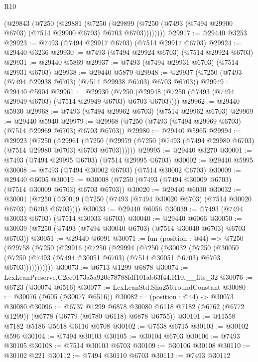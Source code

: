 \begin{lexlean}{R10}
\begin{coremodule}
      (@29843
        (@7250
          (@29881
            (@7250
              (@29899 (@7250 (@7493 (@7494 @29900 @6703) (@7514 @29900 @6703) @6703 @6703))))))))
@29917 := @29440 @3253
@29923 := @7493 (@7494 @29917 @6703) (@7514 @29917 @6703)
@29924 := @29440 @3236
@29930 := @7493 (@7494 @29924 @6703) (@7514 @29924 @6703)
@29931 := @29440 @5869
@29937 := @7493 (@7494 @29931 @6703) (@7514 @29931 @6703)
@29938 := @29440 @5879
@29948 := @29937 (@7250 (@7493 (@7494 @29938 @6703) (@7514 @29938 @6703) @6703 @6703))
@29949 := @29440 @5904
@29961 := @29930
    (@7250 (@29948 (@7250 (@7493 (@7494 @29949 @6703) (@7514 @29949 @6703) @6703 @6703))))
@29962 := @29440 @5930
@29968 := @7493 (@7494 @29962 @6703) (@7514 @29962 @6703)
@29969 := @29440 @5940
@29979 := @29968 (@7250 (@7493 (@7494 @29969 @6703) (@7514 @29969 @6703) @6703 @6703))
@29980 := @29440 @5965
@29994 := @29923
    (@7250
      (@29961
        (@7250 (@29979 (@7250 (@7493 (@7494 @29980 @6703) (@7514 @29980 @6703) @6703 @6703))))))
@29995 := @29440 @3270
@30001 := @7493 (@7494 @29995 @6703) (@7514 @29995 @6703)
@30002 := @29440 @5995
@30008 := @7493 (@7494 @30002 @6703) (@7514 @30002 @6703)
@30009 := @29440 @6005
@30019 := @30008 (@7250 (@7493 (@7494 @30009 @6703) (@7514 @30009 @6703) @6703 @6703))
@30020 := @29440 @6030
@30032 := @30001
    (@7250 (@30019 (@7250 (@7493 (@7494 @30020 @6703) (@7514 @30020 @6703) @6703 @6703))))
@30033 := @29440 @6056
@30039 := @7493 (@7494 @30033 @6703) (@7514 @30033 @6703)
@30040 := @29440 @6066
@30050 := @30039 (@7250 (@7493 (@7494 @30040 @6703) (@7514 @30040 @6703) @6703 @6703))
@30051 := @29440 @6091
@30071 := fun (position : @44) =>
  @7250
    (@29758
      (@7250
        (@29916
          (@7250
            (@29994
              (@7250
                (@30032
                  (@7250
                    (@30050
                      (@7250 (@7493 (@7494 @30051 @6703) (@7514 @30051 @6703) @6703 @6703)))))))))))
@30073 := @6713 @1299 @6878
@30074 := LexLeanPreserve.C2ee0173a5a920c78788fdf101ab63f44.R10.__fits_32
@30076 := @6723 (@30074 @6516)
@30077 := LexLeanStd.Sha256.roundConstant
@30080 := @30076 (@605 (@30077 @6516))
@30082 := (position : @44) -> @30073 @30080
@30096 := @6737
    @1299
    @6878
    @30080
    @6118
    @7182
    (@6762 (@6772 @1299))
    (@6778 (@6779 (@6780 @6118) @6878 @6755))
@30101 := @11558 @7182 @5186 @5618 @6116 @6708
@30102 := @7538 @6715
@30103 := @30102 @596
@30104 := @7494 @30103
@30105 := @30104 @6703
@30106 := @7493 @30105
@30108 := @7514 @30103 @6703
@30109 := @30106 @30108
@30110 := @30102 @221
@30112 := @7494 @30110 @6703
@30113 := @7493 @30112

\end{coremodule}
\end{lexlean}
